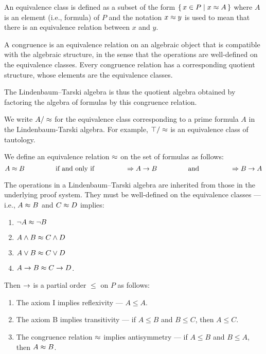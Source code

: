 
An equivalence class is defined as a subset of the form $\set{x \in P | x \approx A}$  where $A$ is an element (i.e., formula) of $P$ and the notation $x \approx y$  is used to mean that there is an equivalence relation between $x$ and $y$. 


A congruence is an equivalence relation on an algebraic object that is compatible with the algebraic structure, in the sense that the operations are well-defined on the equivalence classes. 
Every congruence relation has a corresponding quotient structure, whose elements are the equivalence classes.

The Lindenbaum–Tarski algebra is thus the quotient algebra obtained by factoring the algebra of formulas by this congruence relation.

We write $ A / \approx$  for the equivalence class corresponding to a prime formula  $A$ in the Lindenbaum-Tarski algebra. 
For example, $\top / \approx$  is an equivalence class of tautology. 


We define an equivalence relation $\approx$  on the set of formulas  as follows:
\[  A \approx  B  \phantom{XXXXX}\mbox{if and only if}   \phantom{XXXXX}
\Rightarrow A \to  B \phantom{XXXXX}\mbox{and} \phantom{XXXXX}
  \Rightarrow B \to  A \]


The operations in a Lindenbaum–Tarski algebra  are inherited from those in the underlying proof system.  They  must be well-defined on the equivalence classes  --- 
i.e., $A \approx B$ and $C \approx D$ implies:
\begin{enumerate}
\item $\neg A \approx \neg B$
\item  $A \wedge B \approx C \wedge D$ 
\item  $A \vee B \approx C \vee D$ 
\item  $A \to B \approx C \to D$.
\end{enumerate}


Then  $\to$ is a partial order $\leq$ on $P$ as follows:
\begin{enumerate}
\item The axiom I implies reflexivity  --- $A \leq A$.
\item  The axiom B implies transitivity --- if  $A \leq B$  and $B \leq C$, then $A \leq C$. 
\item  The congruence relation $\approx$ implies antisymmetry --- if $A \leq B$ and $B \leq A$, then $A \approx B$. 
\end{enumerate}


